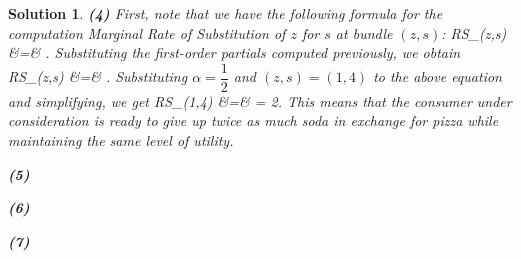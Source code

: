 \documentclass{article} %
\def\eQb#1\eQe{\begin{eqnarray*}#1\end{eqnarray*}}
\theoremstyle{quest}
\newtheorem*{solution}{Solution}
\begin{document}
\begin{solution}
\smallskip

\textbf{(4)}
First, note that we have the following formula for the 
computation Marginal Rate of Substitution of $z$ for $s$ at bundle $(z,s)$:
\eQb
MRS_{}(z,s) &=& .
\eQe
Substituting the first-order partials computed previously, we obtain
\eQb
MRS_{}(z,s) &=& .
\eQe
Substituting $\alpha = \dfrac{1}{2}$ and $(z,s) = (1,4)$ to the above equation and simplifying, we get
\eQb
MRS_{}(1,4) &=&  = 2.
\eQe
This means that the consumer under consideration is ready to give up twice as much soda 
in exchange for pizza while maintaining the same level of utility.

\smallskip

\textbf{(5)}

\smallskip

\textbf{(6)}

\smallskip

\textbf{(7)}


\end{solution}
\end{document}
